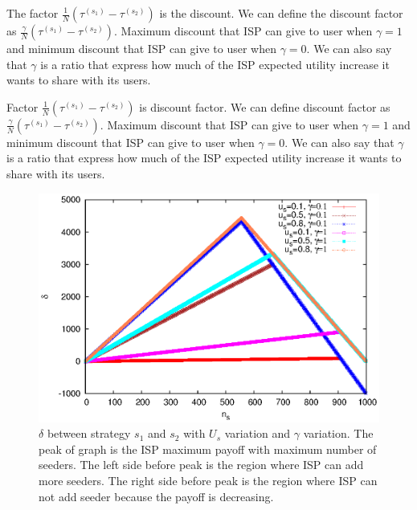 \documentclass[paper]{ieice}
\begin{document}
The factor $\frac{1}{N} (\tau^{(s_1)} - \tau^{(s_2)} )$ is the discount.  
We can define the discount factor as $\frac{\gamma}{N} (\tau^{(s_1)} - \tau^{(s_2)} )$.  
Maximum discount that ISP can give to user when $\gamma=1$ and minimum discount that ISP can give to user when $\gamma=0$.  
We can also say that $\gamma$ is a ratio that express how much of the ISP expected utility increase it wants to share with its users.


Factor $\frac{1}{N} (\tau^{(s_1)} -  \tau^{(s_2)} )$ is discount factor.
We can define discount factor as $\frac{\gamma}{N} (\tau^{(s_1)} -  \tau^{(s_2)} )$.
Maximum discount that ISP can give to user when $\gamma=1$ and minimum discount that ISP can give to user when $\gamma=0$.
We can also say that $\gamma$ is a ratio that express how much of the ISP expected utility increase it wants to share with its users. 

\begin{figure}[th] 
\begin{center}
\includegraphics[scale=0.65]{graphs/plotpay.eps}
\end{center}
\caption{$\delta$ between strategy $s_1$ and $s_2$ with $U_s$ variation and $\gamma$ variation.
The peak of graph is the ISP maximum payoff with maximum number of seeders.
The left side before peak is the region where ISP can add more seeders.
The right side before peak is the region where ISP can not add seeder because the payoff is decreasing.}
\label{fig:delta}
\vspace{-2mm}
\end{figure}

 
\end{document}
